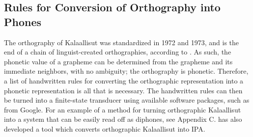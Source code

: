 \documentclass[12pt]{article}
\begin{document}
	\subsection{Rules for Conversion of Orthography into Phones}

	The orthography of Kalaallisut was standardized in 1972 and 1973, and is the end of a chain of linguist-created orthographies, according to \citet{rischel}. As such, the phonetic value of a grapheme can be determined from the grapheme and its immediate neighbors, with no ambiguity; the orthography is phonetic. Therefore, a list of handwritten rules for converting the orthographic representation into a phonetic representation is all that is necessary. The handwritten rules can then be turned into a finite-state transducer using available software packages, such as from Google. For an example of a method for turning orthographic Kalaallisut into a system that can be easily read off as diphones, see Appendix C. \citet{gov} has also developed a tool which converts orthographic Kalaallisut into IPA. \par


\end{document}
